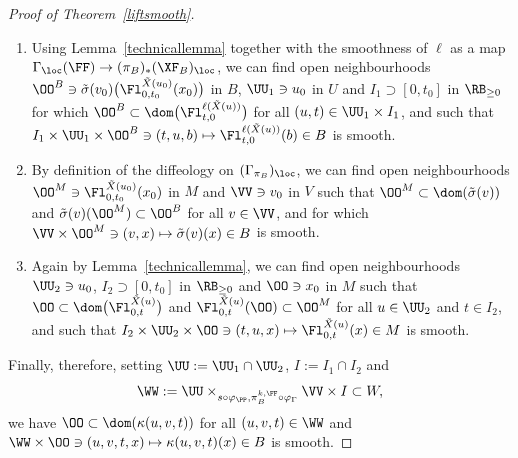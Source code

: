 \begin{proof}[Proof of Theorem~\ref{liftsmooth}]
\begin{enumerate}\itemsep=0pt
\item Using Lemma~\ref{technicallemma} together with the smoothness of $\ell$ as a map $\Gamma_{\loc}(\FF)\rightarrow(\pi_{B})_{*}(\XF_{B})_{\loc}$, we can find open neighbourhoods $\OO^{B}\ni\tilde{\sigma}(v_{0})\big(\Fl^{\tilde{X}(u_{0})}_{0,t_{0}}(x_{0})\big)$ in $B$, $\UU_{1}\ni u_{0}$ in $U$ and $I_{1}\supset[0,t_{0}]$ in $\RB_{\geq0}$ for which $\OO^{B}\subset\dom\big(\Fl^{\ell(\tilde{X}(u))}_{t,0}\big)$ for all $(u,t)\in\UU_{1}\times I_{1}$, and such that $I_{1}\times\UU_{1}\times \OO^{B}\ni(t,u,b)\mapsto\Fl^{\ell(\tilde{X}(u))}_{t,0}(b)\in B$ is smooth.
\item By definition of the diffeology on $(\Gamma_{\pi_{B}})_{\loc}$, we can find open neighbourhoods $\OO^{M}\ni\Fl^{\tilde{X}(u_{0})}_{0,t_{0}}(x_{0})$ in $M$ and $\VV\ni v_{0}$ in $V$ such that $\OO^{M}\subset\dom(\tilde{\sigma}(v))$ and $\tilde{\sigma}(v)(\OO^{M})\subset\OO^{B}$ for all $v\in\VV$, and for which $\VV\times\OO^{M}\ni(v,x)\mapsto\tilde{\sigma}(v)(x)\in B$ is smooth.
\item Again by Lemma~\ref{technicallemma}, we can find open neighbourhoods $\UU_{2}\ni u_{0}$, $I_{2}\supset[0,t_{0}]$ in $\RB_{\geq0}$ and $\OO\ni x_{0}$ in $M$ such that $\OO\subset\dom\big(\Fl^{\tilde{X}(u)}_{0,t}\big)$ and $\Fl^{\tilde{X}(u)}_{0,t}(\OO)\subset\OO^{M}$ for all $u\in\UU_{2}$ and $t\in I_{2}$, and such that $I_{2}\times\UU_{2}\times \OO\ni(t,u,x)\mapsto\Fl^{\tilde{X}(u)}_{0,t}(x)\in M$ is smooth.
\end{enumerate}
Finally, therefore, setting $\UU:=\UU_{1}\cap\UU_{2}$, $I:=I_{1}\cap I_{2}$ and
\begin{gather*}
\WW:=\UU\times_{s\circ\varphi_{\PP},\pi_{B}^{k,\FF}\circ\varphi_{\Gamma}}\VV\times I\subset W,
\end{gather*}
we have $\OO\subset\dom(\kappa(u,v,t))$ for all $(u,v,t)\in\WW$ and $\WW\times\OO\ni(u,v,t,x)\mapsto\kappa(u,v,t)(x)\in B$ is smooth.
\end{proof}
